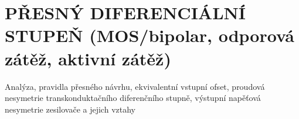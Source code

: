 \section{PŘESNÝ DIFERENCIÁLNÍ STUPEŇ (MOS/bipolar, odporová zátěž, aktivní zátěž)}
Analýza, pravidla přesného návrhu, ekvivalentní vstupní ofset, proudová nesymetrie transkonduktačního diferenčního stupně, výstupní napěťová nesymetrie zesilovače a jejich vztahy